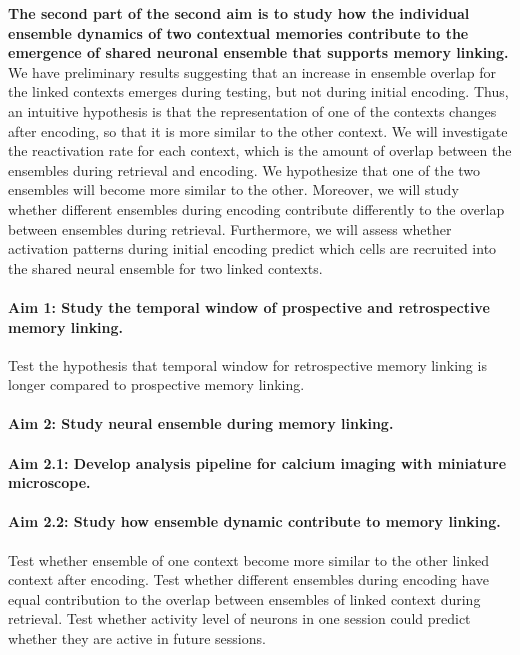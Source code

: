 \documentclass[master.tex]{subfiles}
\begin{document}
\textbf{The second part of the second aim is to study how the individual
  ensemble dynamics of two contextual memories contribute to the emergence of
  shared neuronal ensemble that supports memory linking.} We have preliminary
results suggesting that an increase in ensemble overlap for the linked contexts
emerges during testing, but not during initial encoding. Thus, an intuitive
hypothesis is that the representation of one of the contexts changes after
encoding, so that it is more similar to the other context. We will investigate
the reactivation rate for each context, which is the amount of overlap between
the ensembles during retrieval and encoding. We hypothesize that one of the two
ensembles will become more similar to the other. Moreover, we will study whether
different ensembles during encoding contribute differently to the overlap
between ensembles during retrieval. Furthermore, we will assess whether
activation patterns during initial encoding predict which cells are recruited
into the shared neural ensemble for two linked contexts.

\paragraph{Aim 1: Study the temporal window of prospective and retrospective
  memory linking.}

Test the hypothesis that temporal window for retrospective memory linking is
longer compared to prospective memory linking.

\paragraph{Aim 2: Study neural ensemble during memory linking.}

\paragraph{Aim 2.1: Develop analysis pipeline for calcium imaging with miniature
  microscope.}

\paragraph{Aim 2.2: Study how ensemble dynamic contribute to memory linking.}

Test whether ensemble of one context become more similar to the other linked
context after encoding. Test whether different ensembles during encoding have
equal contribution to the overlap between ensembles of linked context during
retrieval. Test whether activity level of neurons in one session could predict
whether they are active in future sessions.

\newpage
\end{document}
